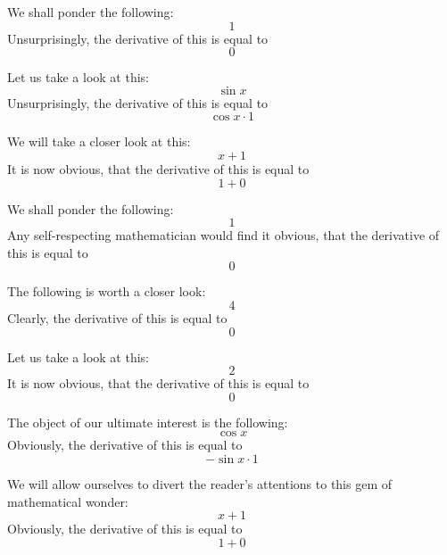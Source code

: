 \documentclass{article}
\begin{document}
We shall ponder the following:
\begin{equation}
1 
\end{equation}
Unsurprisingly, the derivative of this is equal to
\begin{equation}
0 
\end{equation}

Let us take a look at this:
\begin{equation}
\sin x 
\end{equation}
Unsurprisingly, the derivative of this is equal to
\begin{equation}
\cos x \cdot 1 
\end{equation}

We will take a closer look at this:
\begin{equation}
x + 1 
\end{equation}
It is now obvious, that the derivative of this is equal to
\begin{equation}
1 + 0 
\end{equation}

We shall ponder the following:
\begin{equation}
1 
\end{equation}
Any self-respecting mathematician would find it obvious, that the derivative of this is equal to
\begin{equation}
0 
\end{equation}

The following is worth a closer look:
\begin{equation}
4 
\end{equation}
Clearly, the derivative of this is equal to
\begin{equation}
0 
\end{equation}

Let us take a look at this:
\begin{equation}
2 
\end{equation}
It is now obvious, that the derivative of this is equal to
\begin{equation}
0 
\end{equation}

The object of our ultimate interest is the following:
\begin{equation}
\cos x 
\end{equation}
Obviously, the derivative of this is equal to
\begin{equation}
-\sin x \cdot 1 
\end{equation}

We will allow ourselves to divert the reader's attentions to this gem of mathematical wonder:
\begin{equation}
x + 1 
\end{equation}
Obviously, the derivative of this is equal to
\begin{equation}
1 + 0 
\end{equation}
\end{document}

